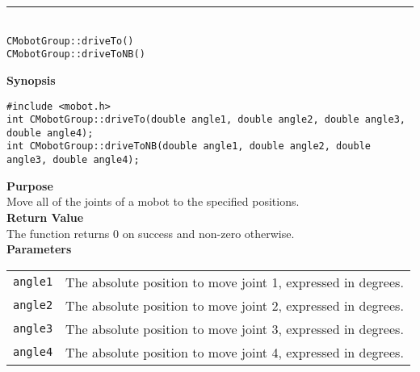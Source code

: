 \noindent
\vspace{5pt}
\rule{4.5in}{0.015in}\\
\noindent
{\LARGE \texttt{CMobotGroup::driveTo()}}\\
{\LARGE \texttt{CMobotGroup::driveToNB()}}\\
{}

\noindent
{\bf Synopsis}
\vspace{-8pt}
\begin{verbatim}
#include <mobot.h>
int CMobotGroup::driveTo(double angle1, double angle2, double angle3, double angle4);
int CMobotGroup::driveToNB(double angle1, double angle2, double angle3, double angle4);
\end{verbatim}

\noindent
{\bf Purpose}\\
Move all of the joints of a mobot to the specified positions.\\

\noindent
{\bf Return Value}\\
The function returns 0 on success and non-zero otherwise.\\

\noindent
{\bf Parameters}\\
\vspace{-0.1in}
\begin{description}
\item               
\begin{tabular}{p{15 mm}p{105 mm}}
\texttt{angle1} & The absolute position to move joint 1, expressed in degrees. \\
\texttt{angle2} & The absolute position to move joint 2, expressed in degrees. \\
\texttt{angle3} & The absolute position to move joint 3, expressed in degrees. \\
\texttt{angle4} & The absolute position to move joint 4, expressed in degrees. \\
\end{tabular}
\end{description}
\noindent

